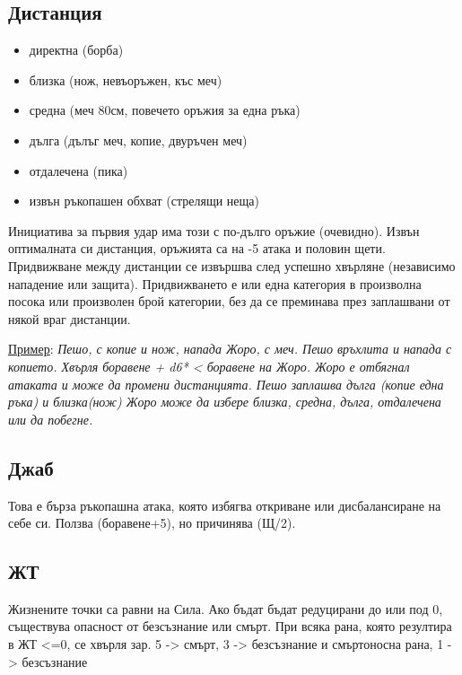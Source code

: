 \subsection{Дистанция}
\begin{multicols}{2}
\begin{itemize}
\item{директна (борба)}
\item{близка (нож, невъоръжен, къс меч)}
\item{средна (меч 80см, повечето оръжия за една ръка)}
\item{дълга (дълъг меч, копие, двуръчен меч)}
\item{отдалечена (пика)}
\item{извън ръкопашен обхват (стрелящи неща)}
\end{itemize}
Инициатива за първия удар има този с по-дълго оръжие (очевидно).
Извън оптималната си дистанция, оръжията са на -5 атака и половин щети.
Придвижване между дистанции се извършва след успешно хвърляне (независимо нападение или защита).
Придвижването е или една категория в произволна посока или произволен брой категории, без да се преминава през заплашвани от някой враг дистанции.
\end{multicols}
\underline{Пример}:
\emph{Пешо, с копие и нож, напада Жоро, с меч.
Пешо връхлита и напада с копието.
Хвърля боравене + d6* < боравене на Жоро.
Жоро е отбягнал атаката и може да промени дистанцията.
Пешо заплашва дълга (копие една ръка) и близка(нож)
Жоро може да избере близка, средна, дълга, отдалечена или да побегне.
}


\subsection{Джаб}
Това е бърза ръкопашна атака, която избягва откриване или дисбалансиране на себе си.
Ползва (боравене+5), но причинява (Щ/2).


\subsection{ЖТ}
Жизнените точки са равни на Сила.
Ако бъдат бъдат редуцирани до или под 0, съществува опасност от безсъзнание или смърт.
При всяка рана, която резултира в ЖТ <=0, се хвърля зар.
5 -> смърт, 3 -> безсъзнание и смъртоносна рана, 1 -> безсъзнание




